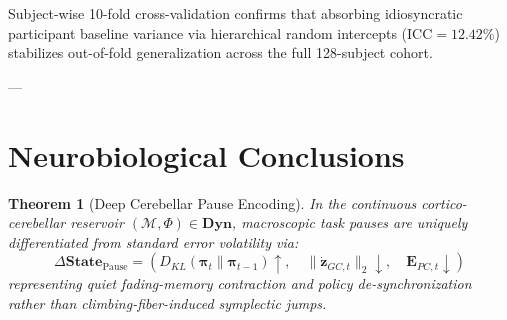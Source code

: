 \documentclass[11pt,twoside,a4paper]{article}
\newtheorem{theorem}{Theorem}
\begin{document}
Subject-wise 10-fold cross-validation confirms that absorbing idiosyncratic participant baseline variance via hierarchical random intercepts ($\text{ICC} = 12.42\%$) stabilizes out-of-fold generalization across the full 128-subject cohort.

---

\section{Neurobiological Conclusions}

\begin{theorem}[Deep Cerebellar Pause Encoding]
In the continuous cortico-cerebellar reservoir $(\mathcal{M}, \Phi) \in \mathbf{Dyn}$, macroscopic task pauses are uniquely differentiated from standard error volatility via:
\begin{equation}
\Delta \mathbf{State}_{\text{Pause}} = \left( D_{KL}(\boldsymbol{\pi}_t \parallel \boldsymbol{\pi}_{t-1}) \uparrow, \quad \|\dot{\mathbf{z}}_{GC,t}\|_2 \downarrow, \quad \mathbf{E}_{PC,t} \downarrow \right)
\end{equation}
representing quiet fading-memory contraction and policy de-synchronization rather than climbing-fiber-induced symplectic jumps.
\end{theorem}
\end{document}
